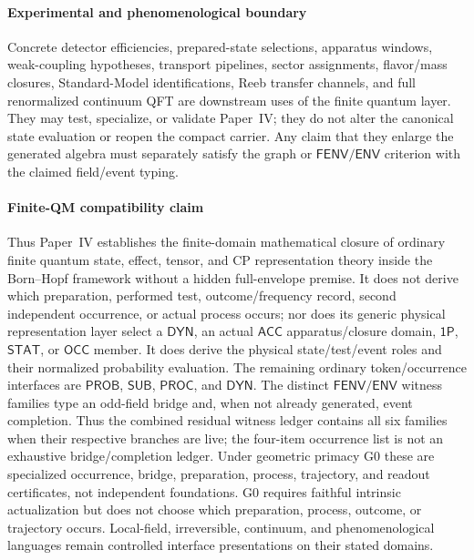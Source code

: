 \documentclass[12pt,a4paper]{article}
\begin{document}
\paragraph{Experimental and phenomenological boundary}
\label{p4:sec:conclusion-experimental-boundary}

Concrete detector efficiencies, prepared-state selections, apparatus windows,
weak-coupling hypotheses, transport pipelines, sector assignments,
flavor/mass closures, Standard-Model identifications, Reeb transfer channels,
and full renormalized continuum QFT are downstream uses of the finite quantum
layer.  They may test, specialize, or validate Paper~IV; they do not alter the
canonical state evaluation or reopen the compact carrier.  Any claim that
they enlarge the generated algebra must separately satisfy the graph or
\(\mathsf{FENV}/\mathsf{ENV}\) criterion with the claimed field/event typing.



\paragraph{Finite-QM compatibility claim}
\label{p4:sec:conclusion-final-closure}

Thus Paper~IV establishes the finite-domain mathematical closure of ordinary
finite quantum state, effect, tensor, and CP representation theory inside the
Born--Hopf framework without a hidden full-envelope premise.  It does not
derive which preparation, performed test, outcome/frequency record, second
independent occurrence, or actual process occurs; nor does its generic
physical representation layer select a \(\mathsf{DYN}\), an actual
\(\mathsf{ACC}\) apparatus/closure domain, \(\mathsf{1P}\),
\(\mathsf{STAT}\), or \(\mathsf{OCC}\)
member.  It
does derive the physical state/test/event roles and their normalized
probability evaluation.  The remaining ordinary token/occurrence interfaces are
\(\mathsf{PROB}\), \(\mathsf{SUB}\),
\(\mathsf{PROC}\), and \(\mathsf{DYN}\).  The distinct
\(\mathsf{FENV}/\mathsf{ENV}\) witness families type an odd-field bridge and,
when not already generated, event completion.  Thus the combined residual
witness ledger contains all six families when their respective branches are
live; the four-item occurrence list is not an exhaustive bridge/completion
ledger.  Under geometric primacy G0 these are specialized
occurrence, bridge, preparation, process, trajectory, and readout
certificates, not independent foundations.  G0 requires faithful intrinsic
actualization but does not choose which preparation, process, outcome, or
trajectory occurs.  Local-field,
irreversible, continuum, and phenomenological languages remain controlled
interface presentations on their stated domains.
\end{document}
